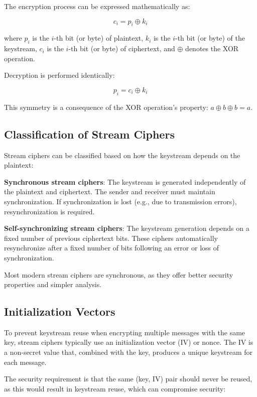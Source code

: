 \documentclass[12pt,a4paper,oneside]{report}
\begin{document}
The encryption process can be expressed mathematically as:

\begin{equation}
    c_i = p_i \oplus k_i
\end{equation}

where $p_i$ is the $i$-th bit (or byte) of plaintext, $k_i$ is the $i$-th bit (or byte) of the keystream, $c_i$ is the $i$-th bit (or byte) of ciphertext, and $\oplus$ denotes the XOR operation.

Decryption is performed identically:

\begin{equation}
    p_i = c_i \oplus k_i
\end{equation}

This symmetry is a consequence of the XOR operation's property: $a \oplus b \oplus b = a$.

\subsection{Classification of Stream Ciphers}

Stream ciphers can be classified based on how the keystream depends on the plaintext:

\textbf{Synchronous stream ciphers}: The keystream is generated independently of the plaintext and ciphertext. The sender and receiver must maintain synchronization. If synchronization is lost (e.g., due to transmission errors), resynchronization is required.

\textbf{Self-synchronizing stream ciphers}: The keystream generation depends on a fixed number of previous ciphertext bits. These ciphers automatically resynchronize after a fixed number of bits following an error or loss of synchronization.

Most modern stream ciphers are synchronous, as they offer better security properties and simpler analysis.

\subsection{Initialization Vectors}

To prevent keystream reuse when encrypting multiple messages with the same key, stream ciphers typically use an initialization vector (IV) or nonce. The IV is a non-secret value that, combined with the key, produces a unique keystream for each message.

The security requirement is that the same (key, IV) pair should never be reused, as this would result in keystream reuse, which can compromise security:
\end{document}
